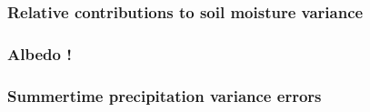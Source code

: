 \begin{frame}
\frametitle{Relative contributions {\normalsize to soil moisture variance}}


\end{frame}

\begin{frame}
\frametitle{Albedo !}



\end{frame}

\begin{frame}
\frametitle{Summertime precipitation variance errors}


\end{frame}




